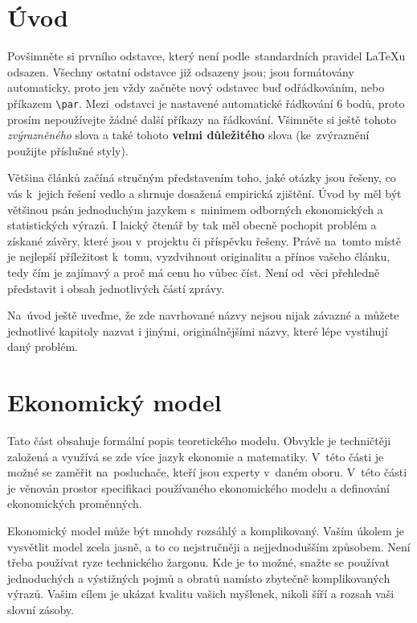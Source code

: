 \documentclass[12pt,a4paper,oneside,final]{article}
\theoremstyle{definition}
\theoremstyle{remark}
\numberwithin{equation}{section}
\begin{document}
\VytvorTitulniStranu

\section{Úvod}
\cite{cipra} \cite{brockwell_ts}Povšimněte si prvního odstavce, který není podle~standardních pravidel \LaTeX{u} odsazen. Všechny ostatní odstavce již odsazeny jsou; jsou formátovány automaticky, proto jen vždy začněte nový odstavec buď odřádkováním, nebo příkazem \verb|\par|. Mezi~odstavci je nastavené automatické řádkování 6 bodů, proto prosím nepoužívejte žádné další příkazy na řádkování. Všimněte si ještě tohoto \emph{zvýrazněného} slova a také tohoto \textbf{velmi důležitého} slova (ke~zvýraznění použijte příslušné styly).

Většina článků začíná stručným představením toho, jaké otázky jsou řešeny, co vás k~jejich řešení vedlo a shrnuje dosažená empirická zjištění. Úvod by  měl být většinou psán jednoduchým  jazykem s~minimem odborných ekonomických a statistických výrazů. I laický čtenář by tak měl obecně pochopit problém a získané závěry, které jsou v~projektu či příspěvku řešeny. Právě na~tomto místě je nejlepší příležitost k~tomu, vyzdvihnout originalitu a přínos vašeho článku, tedy čím je zajímavý a proč má cenu ho vůbec číst. Není od~věci přehledně představit i obsah jednotlivých částí zprávy.

Na~úvod ještě uveďme, že zde navrhované názvy nejsou nijak závazné a můžete jednotlivé kapitoly nazvat i jinými, originálnějšími názvy, které lépe vystihují daný problém. 

\section{Ekonomický model}

Tato část obsahuje formální popis teoretického modelu. Obvykle je techničtěji založená a využívá se zde více jazyk ekonomie a matematiky. V~této části je možné se zaměřit na~posluchače, kteří jsou experty v~daném oboru. V~této části je věnován prostor specifikaci používaného ekonomického modelu a definování ekonomických proměnných.

Ekonomický model může být mnohdy rozsáhlý a komplikovaný. Vaším úkolem je vysvětlit model zcela jasně, a to co nejstručněji a nejjednodušším způsobem. Není třeba používat ryze technického žargonu. Kde je to možné, snažte se používat jednoduchých a výstižných pojmů a obratů namísto zbytečně komplikovaných výrazů. Vašim cílem je ukázat kvalitu vašich myšlenek, nikoli šíří a rozsah vaši slovní zásoby.
\end{document}
